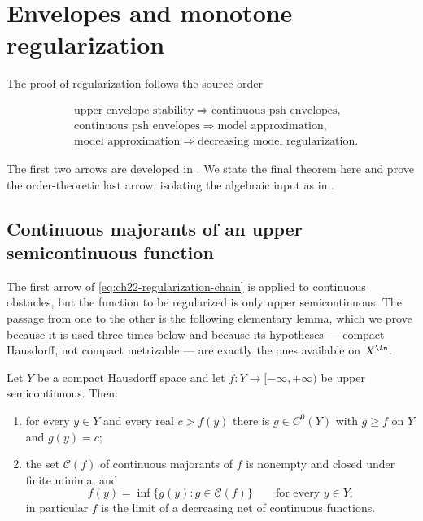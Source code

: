 \section{Envelopes and monotone regularization}
\label{sec:ch22-regularization}

The proof of regularization follows the source order

\[
 \begin{aligned}
  &\text{upper-envelope stability}
    \Longrightarrow \text{continuous psh envelopes},\\
  &\text{continuous psh envelopes}
    \Longrightarrow \text{model approximation},\\
  &\text{model approximation}
    \Longrightarrow \text{decreasing model regularization}.
 \end{aligned}
\tag{22.73}\label{eq:ch22-regularization-chain}
\]

The first two arrows are developed in .  We state
the final theorem here and prove the order-theoretic last arrow, isolating
the algebraic input as in .

\subsection{Continuous majorants of an upper semicontinuous function}

The first arrow of \eqref{eq:ch22-regularization-chain} is applied to
continuous obstacles, but the function to be regularized is only upper
semicontinuous.  The passage from one to the other is the following
elementary lemma, which we prove because it is used three times below and
because its hypotheses --- compact Hausdorff, not compact metrizable --- are
exactly the ones available on \(X^{\An}\).

\begin{lemma}
\label{lem:ch22-continuous-majorant}
Let \(Y\) be a compact Hausdorff space and let
\(f:Y\to[-\infty,+\infty)\) be upper semicontinuous.  Then:
\begin{enumerate}
\item\label{itm:ch22-maj:point} for every \(y\in Y\) and every real
\(c>f(y)\) there is \(g\in C^0(Y)\) with \(g\geq f\) on \(Y\) and
\(g(y)=c\);
\item\label{itm:ch22-maj:inf} the set \(\mathcal C(f)\) of continuous
majorants of \(f\) is nonempty and closed under finite minima, and
\[
 f(y)=\inf\{g(y):g\in\mathcal C(f)\}
 \qquad\text{for every }y\in Y;
\tag{22.74}\label{eq:ch22-continuous-majorant-inf}
\]
in particular \(f\) is the limit of a decreasing net of continuous
functions.
\end{enumerate}
\end{lemma}

